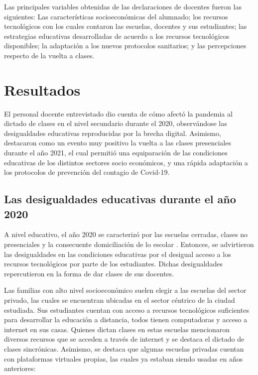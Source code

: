 \documentclass[spanish]{textolivre}
\begin{document}
Las principales variables obtenidas de las declaraciones de docentes fueron las siguientes: Las características socioeconómicas del alumnado; los recursos tecnológicos con los cuales contaron las escuelas, docentes y sus estudiantes; las estrategias educativas desarrolladas de acuerdo a los recursos tecnológicos disponibles; la adaptación a los nuevos protocolos sanitarios; y las percepciones respecto de la vuelta a clases.

\section{Resultados}\label{sec-organizacao}
El personal docente entrevistado dio cuenta de cómo afectó la pandemia al dictado de clases en el nivel secundario durante el 2020, observándose las desigualdades educativas reproducidas por la brecha digital. Asimismo, destacaron como un evento muy positivo la vuelta a las clases presenciales durante el año 2021, el cual permitió una equiparación de las condiciones educativas de los distintos sectores socio económicos, y una rápida adaptación a los protocolos de prevención del contagio de Covid-19.

\subsection{Las desigualdades educativas durante el año 2020}\label{sec-organizacao-latex}
A nivel educativo, el año 2020 se caracterizó por las escuelas cerradas, clases no presenciales y la consecuente domiciliación de lo escolar \cite{dussel_escuela_2020}. Entonces, se advirtieron las desigualdades en las condiciones educativas por el desigual acceso a los recursos tecnológicos por parte de los estudiantes. Dichas desigualdades repercutieron en la forma de dar clases de sus docentes.

Las familias con alto nivel socioeconómico suelen elegir a las escuelas del sector privado, las cuales se encuentran ubicadas en el sector céntrico de la ciudad estudiada. Sus estudiantes cuentan con acceso a recursos tecnológicos suficientes para desarrollar la educación a distancia, todos tienen computadoras y acceso a internet en sus casas. Quienes dictan clases en estas escuelas mencionaron diversos recursos que se acceden a través de internet y se destaca el dictado de clases sincrónicas. Asimismo, se destaca que algunas escuelas privadas cuentan con plataformas virtuales propias, las cuales ya estaban siendo usadas en años anteriores:
\end{document}
